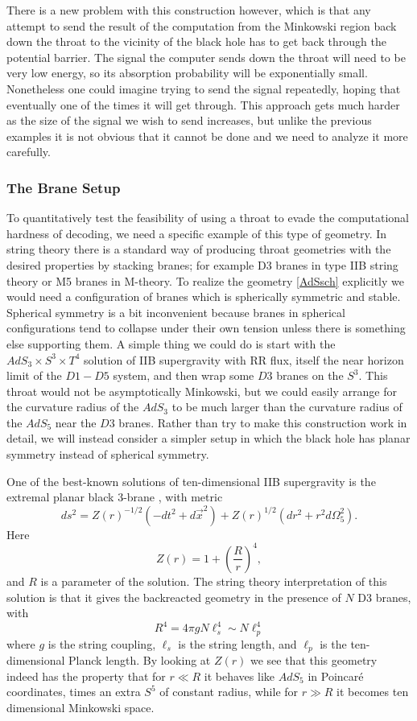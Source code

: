 \documentclass[12pt]{article}
\newcommand{\be}{\begin{equation}}
\newcommand{\ee}{\end{equation}}
\begin{document}
There is a new problem with this construction however, which is that any attempt to send the result of the computation from the Minkowski region back down the throat to the vicinity of the black hole has to get back through the potential barrier.  The signal the computer sends down the throat will need to be very low energy, so its absorption probability will be exponentially small.  Nonetheless one could imagine trying to send the signal repeatedly, hoping that eventually one of the times it will get through.  This approach gets much harder as the size of the signal we wish to send increases, but unlike the previous examples it is not obvious that it cannot be done and we need to analyze it more carefully.  

\subsubsection{The Brane Setup}
To quantitatively test the feasibility of using a throat to evade the computational hardness of decoding, we need a specific example of this type of geometry.  In string theory there is a standard way of producing throat geometries with the desired properties by stacking branes; for example D3 branes in type IIB string theory or M5 branes in M-theory.  To realize the geometry \eqref{AdSsch} explicitly we would need a configuration of branes which is spherically symmetric and stable.  Spherical symmetry is a bit inconvenient because branes in spherical configurations tend to collapse under their own tension unless there is something else supporting them.  A simple thing we could do is start with the $AdS_3\times S^3\times T^4$ solution of IIB supergravity with RR flux, itself the near horizon limit of the $D1-D5$ system, and then wrap some $D3$ branes on the $S^3$.  This throat would not be asymptotically Minkowski, but we could easily arrange for the curvature radius of the $AdS_3$ to be much larger than the curvature radius of the $AdS_5$ near the $D3$ branes.  Rather than try to make this construction work in detail, we will instead consider a simpler setup in which the black hole has planar symmetry instead of spherical symmetry.  

One of the best-known solutions of ten-dimensional IIB supergravity is the extremal planar black 3-brane \cite{Horowitz:1991cd}, with metric
\be\label{extbb}
ds^2=Z(r)^{-1/2}\left(-dt^2+d\vec{x}^2\right)+Z(r)^{1/2}\left(dr^2+r^2 d\Omega_5^2\right).
\ee
Here
\be
Z(r)=1+\left(\frac{R}{r}\right)^4,
\ee
and $R$ is a parameter of the solution.  The string theory interpretation of this solution is that it gives the backreacted geometry in the presence of $N$ D3 branes, with
\be
R^4=4\pi g N \ell_s^4\sim N \ell_p^4
\ee
where $g$ is the string coupling, $\ell_s$ is the string length, and $\ell_p$ is the ten-dimensional Planck length.  By looking at $Z(r)$ we see that this geometry indeed has the property that for $r\ll R$ it behaves like $AdS_5$ in Poincar\'e coordinates, times an extra $S^5$ of constant radius, while for $r\gg R$ it becomes ten dimensional Minkowski space.
\end{document}
